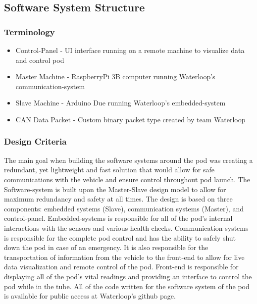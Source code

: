 \documentclass[main.tex]{subfile}
\begin{document}
    \subsection{Software System Structure}
    \subsubsection{Terminology}
    \begin{itemize}
        \item Control-Panel - UI interface running on a remote machine to visualize data and control pod
        \item Master Machine - RaspberryPi 3B computer running Waterloop’s communication-system
        \item Slave Machine - Arduino Due running Waterloop’s embedded-system
        \item CAN Data Packet - Custom binary packet type created by team Waterloop
    \end{itemize}
    \subsubsection{Design Criteria}
    The main goal  when building the software systems around the pod was creating a redundant, yet lightweight and fast solution that would allow for safe communications with the vehicle and ensure control throughout pod launch. The Software-system is built upon the Master-Slave design model to allow for maximum redundancy and safety at all times. The design is based on three components: embedded systems (Slave), communication systems (Master), and control-panel. Embedded-systems is responsible for all of the pod’s internal interactions with the sensors and various health checks. Communication-systems is responsible for the complete pod control and has the ability to safely shut down the pod in case of an emergency. It is also responsible for the transportation of information from the vehicle to the front-end to allow for live data visualization and remote control of the pod. Front-end is responsible for displaying all of the pod’s vital readings and providing an interface to control the pod while in the tube. All of the code written for the software system of the pod is available for public access at Waterloop’s github page.
\end{document}
